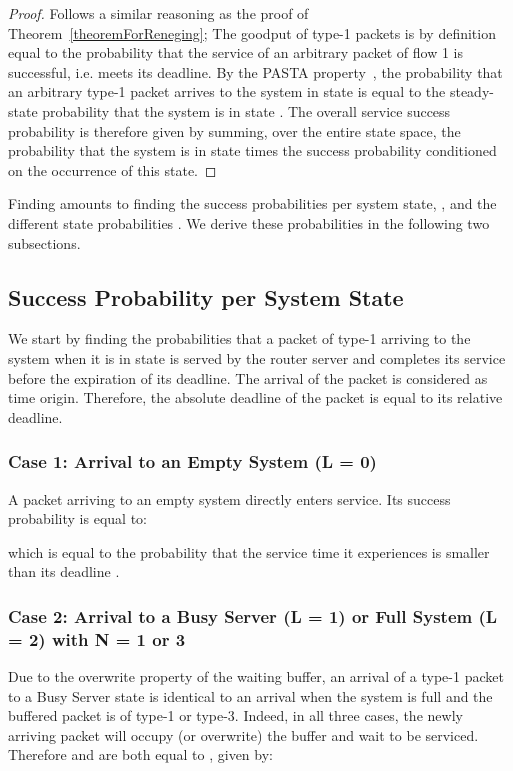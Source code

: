 \documentclass[preprint,12pt]{elsarticle}
\theoremstyle{definition}
\theoremstyle{plain}
\theoremstyle{remark}
\begin{document}
\begin{proof}
Follows a similar reasoning as the proof of Theorem~\ref{theoremForReneging}; The goodput  of type-1 packets is by definition equal to the probability that the service of an arbitrary packet of flow 1 is successful, i.e. meets its deadline. By the PASTA property~\cite{wolff_poisson_1982}, the probability that an arbitrary type-1 packet arrives to the system in state  is equal to the steady-state probability that the system is in state . The overall service success probability is therefore given by summing, over the entire state space, the probability that the system is in state  times the success probability conditioned on the occurrence of this state.
\end{proof}
\smallskip
Finding  amounts to finding the success probabilities per system state, , and the different state probabilities . We derive these probabilities in the following two subsections.

\subsection*{Success Probability per System State}

We start by finding the probabilities  that a packet of type-1 arriving to the system when it is in state  is served by the router server and completes its service before the expiration of its deadline. The arrival of the packet is considered as time origin. Therefore, the absolute deadline of the packet is equal to its relative deadline.

\smallskip
\subsubsection*{Case 1: Arrival to an Empty System (L = 0)}

A packet arriving to an empty system directly enters service. Its success probability is equal to:

which is equal to the probability that the service time it experiences is smaller than its deadline .

\smallskip
\subsubsection*{Case 2: Arrival to a Busy Server (L = 1) or Full System (L = 2) with N = 1 or 3}
Due to the overwrite property of the waiting buffer, an arrival of a type-1 packet to a Busy Server state is identical to an arrival when the system is full and the buffered packet is of type-1 or type-3. Indeed, in all three cases, the newly arriving packet will occupy (or overwrite) the buffer and wait to be serviced. Therefore  and  are both equal to , given by:
\end{document}
